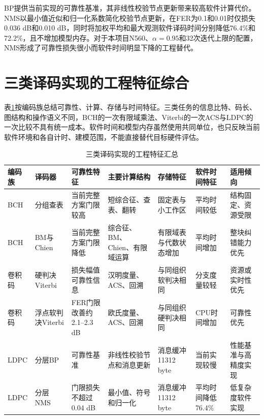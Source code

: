 BP提供当前实现的可靠性基准，其非线性校验节点更新带来较高软件计算代价。NMS以最小值近似和归一化系数简化校验节点更新，在FER为0.1和0.01时仅损失0.036 dB和0.010 dB，同时将加权平均和最大观测软件译码时间分别降低76.4\%和72.2\%，且不增加模型内存。对于本项目N560、$\alpha=0.95$和32次迭代上限的配置，NMS形成了可靠性损失很小而软件时间明显下降的工程替代。

\section{三类译码实现的工程特征综合}

表\ref{tab:s6-engineering-summary}按编码族总结可靠性、计算、存储与时间特征。三类任务的信息比特、码长、图结构和操作语义不同，BCH的一次有限域乘法、Viterbi的一次ACS与LDPC的一次比较不具有统一成本。软件时间和模型内存虽然使用共同单位，也只反映当前软件环境和各自计时、建模范围，不能直接替代目标硬件评估。

\begin{table}[htbp]
  \centering
  \scriptsize
  \caption{三类译码实现的工程特征汇总}
  \label{tab:s6-engineering-summary}
  \setlength{\tabcolsep}{1.7pt}
  \begin{tabular}{p{}p{}p{}p{}p{}p{}p{}}
    \toprule
    编码族 & 译码器 & 可靠性特征 & 主要计算结构 & 存储特征 & 软件时间特征 & 适用倾向 \\
    \midrule
    BCH & 分组查表 & 当前完整方案门限较高 & 短综合征、查表、翻转 & 固定表与小工作区 & 平均时间较低 & 结构固定、资源受限 \\
    BCH & BM与Chien & 当前完整方案门限降低 & 综合征、BM、Chien、有限域运算 & 有限域表与代数状态增加 & 平均时间增加 & 整块纠错能力优先 \\
    卷积码 & 硬判决Viterbi & 损失幅值可靠性信息 & 汉明度量、ACS、回溯 & 与同组织软判决相同 & 分支度量较轻 & 资源或实时性优先 \\
    卷积码 & 浮点软判决Viterbi & FER门限改善约2.1--2.3 dB & 欧氏度量、ACS、回溯 & 与同组织硬判决相同 & CPU时间增加 & 可靠性优先 \\
    LDPC & 分层BP & 可靠性基准 & 非线性校验节点和消息更新 & 消息缓冲11312 byte & 当前实现较慢 & 性能基准与高精度实现 \\
    LDPC & 分层NMS & 门限损失不超过0.04 dB & 最小值、符号和归一化 & 消息缓冲11312 byte & 平均时间降低76.4\% & 低复杂度软件实现 \\
    \bottomrule
  \end{tabular}
\end{table}

